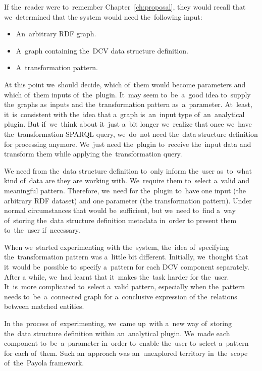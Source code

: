 If the~reader were to~remember Chapter~\ref{ch:proposal}, they would recall that we~determined that 
the system would need the~following input:
\begin{itemize}
  \item An~arbitrary RDF graph.
  \item A~graph containing the~DCV data structure definition.
  \item A~transformation pattern.
\end{itemize}

At this point we~should decide, which of~them would become parameters and which of~them inputs of~the~plugin. It~may seem to~be~a~good idea to~supply the~graphs as~inputs and the~transformation pattern as~a~parameter. At~least, it~is~consistent with the~idea that a~graph is~an~input type of~an~analytical plugin. 
But if~we~think about it~just a~bit longer we~realize that once we~have the~transformation SPARQL query, we~do~not need the~data structure definition for 
processing anymore. We~just need the~plugin to~receive the~input data and transform 
them while applying the~transformation query.

We need from the~data structure definition to~only inform the~user as~to~what kind of~data are they 
are working 
with. We~require them to~select a~valid and meaningful pattern. 
Therefore, we~need for the~plugin to~have one input (the arbitrary RDF dataset) and 
one parameter (the transformation pattern). Under normal circumstances
that would be~sufficient, but we~need to~find a~way of~storing the~data structure definition metadata in~order 
to present them to~the~user if~necessary.

When we~started experimenting with the~system, the~idea of~specifying the~transformation pattern was a~little bit different. Initially, we~thought that it~would be~possible to~specify a~pattern for each DCV component separately. After 
a while, we~had learnt that it~makes the~task harder for the~user. It~is~more complicated to~select a~valid pattern, especially when the~pattern needs to~be~a~connected graph for a~conclusive expression
of the~relations between matched entities.

In the~process of~experimenting, we~came up~with a~new way of~storing the~data structure definition within an~analytical plugin. We~made each component to~be~a~parameter in~order to~enable the~user to~select a~pattern for each of~them. Such an~approach was an~unexplored territory in~the~scope of~the~Payola framework.

